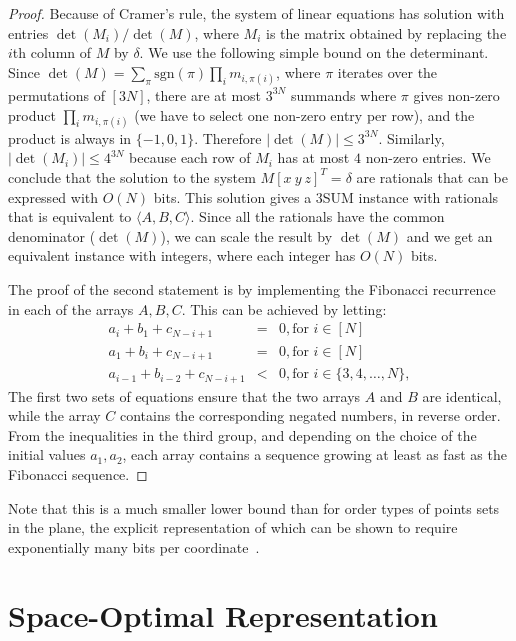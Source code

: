 \begin{proof}
Because of Cramer's rule, the system of linear equations has solution with entries
$\det(M_i)/\det(M)$,
where $M_i$ is the matrix obtained by replacing the $i$th column of $M$ by $\delta$.
We use the following simple bound on the determinant.
Since $\det(M)=\sum_{\pi}\mathrm{sgn}(\pi) \prod_i m_{i,\pi(i)}$, where
$\pi$ iterates over the permutations of $[3N]$, there are
at most $3^{3N}$ summands where $\pi$ gives non-zero product $\prod_i m_{i,\pi(i)}$ (we have
to select one non-zero entry per row), and the product is always in $\{ -1,0,1\}$.
Therefore $|\det(M)|\leq 3^{3N}$. Similarly, $|\det(M_i)|\leq 4^{3N}$ because
each row of $M_i$ has at most $4$ non-zero entries.
We conclude that the solution to the system $M [x~ y ~z]^T=\delta$
are rationals that can be expressed with $O(N)$ bits. This solution gives
a 3SUM instance with rationals that is equivalent to $\langle A, B, C \rangle$.
Since all the rationals have the common denominator ($\det(M)$), we can scale the result
by $\det(M)$ and we get an equivalent instance with integers, where
each integer has $O(N)$ bits.

The proof of the second statement is by implementing the Fibonacci recurrence in each of the
arrays $A,B,C$. This can be achieved by letting:
\begin{eqnarray*}
  a_i + b_1 + c_{N-i+1} & = & 0, \text{for }i\in [N] \\
  a_1 + b_i + c_{N-i+1} & = & 0, \text{for }i\in [N] \\
  a_{i-1} + b_{i-2} + c_{N-i+1} & < & 0, \text{for }i\in \{3,4,\ldots ,N\},
\end{eqnarray*}
The first two sets of equations ensure that the two arrays $A$ and $B$ are identical, while
the array $C$ contains the corresponding negated numbers, in reverse order.
From the inequalities in the third group, and depending on the choice of the initial values $a_1, a_2$,
each array contains a sequence growing at least as fast as the Fibonacci sequence.
\end{proof}

Note that this is a much smaller lower bound than for order types of points sets in the plane,
the explicit representation of which can be shown to require exponentially many bits per coordinate~\cite{GPS89}.

\section{Space-Optimal Representation}%
\label{s:space}

